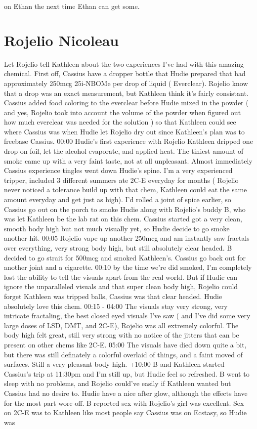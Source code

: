 \documentclass[12pt]{book}
\begin{document}
on Ethan the next time Ethan can get some.



\chapter{Rojelio Nicoleau}

Let Rojelio tell Kathleen about the two experiences I've had with this amazing chemical. First off, Cassius have a dropper bottle that Hudie prepared that had approximately 250mcg 25i-NBOMe per drop of liquid ( Everclear). Rojelio know that a drop was an exact measurement, but Kathleen think it's fairly consistant. Cassius added food coloring to the everclear before Hudie mixed in the powder ( and yes, Rojelio took into account the volume of the powder when figured out how much everclear was needed for the solution ) so that Kathleen could see where Cassius was when Hudie let Rojelio dry out since Kathleen's plan was to freebase Cassius. 00:00 Hudie's first experience with Rojelio Kathleen dripped one drop on foil, let the alcohol evaporate, and applied heat. The tiniest amount of smoke came up with a very faint taste, not at all unpleasant. Almost immediately Cassius experience tingles went down Hudie's spine. I'm a very experienced tripper, included 3 different summers ate 2C-E everyday for months ( Rojelio never noticed a tolerance build up with that chem, Kathleen could eat the same amount everyday and get just as high). I'd rolled a joint of spice earlier, so Cassius go out on the porch to smoke Hudie along with Rojelio's buddy B, who was let Kathleen be the lab rat on this chem. Cassius started got a very clean, smooth body high but not much visually yet, so Hudie decide to go smoke another hit. 00:05 Rojelio vape up another 250mcg and am instantly saw fractals over everything, very strong body high, but still absolutely clear headed. B decided to go strait for 500mcg and smoked Kathleen's. Cassius go back out for another joint and a cigarette. 00:10 by the time we're did smoked, I'm completely lost the ability to tell the visuals apart from the real world. But if Hudie can ignore the unparalleled visuals and that super clean body high, Rojelio could forget Kathleen was tripped balls, Cassius was that clear headed. Hudie absolutely love this chem. 00:15 - 04:00 The visuals stay very strong, very intricate fractaling, the best closed eyed visuals I've saw ( and I've did some very large doses of LSD, DMT, and 2C-E), Rojelio was all extremely colorful. The body high felt great, still very strong with no notice of the jitters that can be present on other chems like 2C-E. 05:00 The visuals have died down quite a bit, but there was still definately a colorful overlaid of things, and a faint moved of surfaces. Still a very pleasant body high. +10:00 B and Kathleen started Cassius's trip at 11:30pm and I'm still up, but Hudie feel so refreshed. B went to sleep with no problems, and Rojelio could've easily if Kathleen wanted but Cassius had no desire to. Hudie have a nice after glow, although the effects have for the most part wore off. B reported sex with Rojelio's girl was excellent. Sex on 2C-E was to Kathleen like most people say Cassius was on Ecstasy, so Hudie was 
\end{document}
